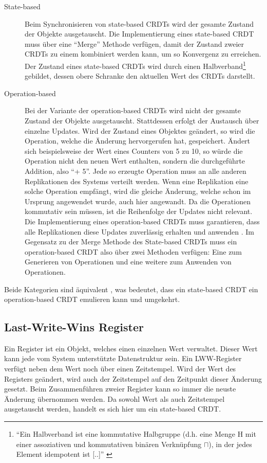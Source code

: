 \documentclass[a4paper, 12pt]{scrreprt}
\begin{document}
\begin{description}
\label{sec:stateopbased}
	\item[State-based]
	Beim Synchronisieren von state-based \acp{CRDT} wird der gesamte Zustand der Objekte ausgetauscht. Die Implementierung eines state-based CRDT muss über eine \enquote{Merge} Methode verfügen, damit der Zustand zweier \acp{CRDT} zu einem kombiniert werden kann, um so Konvergenz zu erreichen. Der Zustand eines state-based \acp{CRDT} wird durch einen Halbverband\footnote{\enquote{Ein Halbverband ist eine kommutative Halbgruppe (d.h. eine Menge H mit einer assoziativen und kommutativen binären Verknüpfung $\sqcap$), in der jedes Element idempotent ist [..]} \autocite{MiscHalbverband}} gebildet, dessen obere Schranke den aktuellen Wert des \acp{CRDT} darstellt. \autocite{InproceedingsStateBased}
	
	\item[Operation-based]
	Bei der Variante der operation-based \acp{CRDT} wird nicht der gesamte Zustand der Objekte ausgetauscht. Stattdessen erfolgt der Austausch über einzelne Updates. Wird der Zustand eines Objektes geändert, so wird die Operation, welche die Änderung hervorgerufen hat, gespeichert. Ändert sich beispielsweise der Wert eines Counters von 5 zu 10, so würde die Operation nicht den neuen Wert enthalten, sondern die durchgeführte Addition, also \enquote{+ 5}. Jede so erzeugte Operation muss an alle anderen Replikationen des Systems verteilt werden. Wenn eine Replikation eine solche Operation empfängt, wird die gleiche Änderung, welche schon im Ursprung angewendet wurde, auch hier angewandt. Da die Operationen kommutativ sein müssen, ist die Reihenfolge der Updates nicht relevant. Die Implementierung eines operation-based \acp{CRDT} muss garantieren, dass alle Replikationen diese Updates zuverlässig erhalten und anwenden \autocite[S.18-19]{ArticleCRDTOverview}. Im Gegensatz zu der Merge Methode des State-based \acp{CRDT} muss ein operation-based CRDT also über zwei Methoden verfügen: Eine zum Generieren von Operationen und eine weitere zum Anwenden von Operationen.
\end{description} 

Beide Kategorien sind äquivalent \autocite[S. 9]{InproceedingsCRDTOriginal}, was bedeutet, dass ein state-based CRDT ein operation-based CRDT emulieren kann und umgekehrt.


\subsection{Last-Write-Wins Register}
\label{lwwRegister}
\sloppypar
Ein Register ist ein Objekt, welches einen einzelnen Wert verwaltet. Dieser Wert kann jede vom System unterstützte Datenstruktur sein. Ein \ac{LWW-Register} verfügt neben dem Wert noch über einen Zeitstempel. Wird der Wert des Registers geändert, wird auch der Zeitstempel auf den Zeitpunkt dieser Änderung gesetzt. Beim Zusammenführen zweier Register kann so immer die neuste Änderung übernommen werden. Da sowohl Wert als auch Zeitstempel ausgetauscht werden, handelt es sich hier um ein state-based CRDT.
\end{document}
